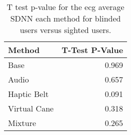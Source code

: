 
\begin{table}[!htb]
\centering
\caption{T test p-value for the ecg average SDNN each method for blinded users versus sighted users.}
\label{tab:ttest_ecg_sdnn}
\begin{tabular}{lr}
\toprule
      Method &  T-Test P-Value \\
\midrule
        Base &           0.969 \\
       Audio &           0.657 \\
 Haptic Belt &           0.091 \\
Virtual Cane &           0.318 \\
     Mixture &           0.265 \\
\bottomrule
\end{tabular}
\end{table}


